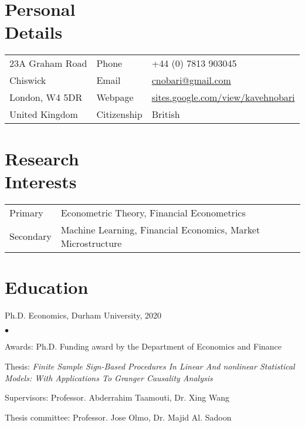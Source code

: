 \documentclass[margin,line,pifont,palatino,courier]{res}
\newenvironment{list2}{
  \begin{list}{$\bullet$}{%
      \setlength{\itemsep}{0in}
      \setlength{\parsep}{0in} \setlength{\parskip}{0in}
      \setlength{\topsep}{0in} \setlength{\partopsep}{0in}
      \setlength{\leftmargin}{0.2in}}}{\end{list}}
\begin{document}

\begin{resume}

\section{\sc \bf Personal\\ Details}

\vspace{.05in}

\begin{tabular}{@{}p{2.0in}p{0.70in}p{3.5in}}
23A Graham Road & Phone &+44 (0) 7813 903045 \\
Chiswick                        &Email &\href{mailto: cnobari@gmail.com}{cnobari@gmail.com}\\
London, W4 5DR      &Webpage &\href{https://sites.google.com/view/kavehnobari}{sites.google.com/view/kavehnobari}\\
United Kingdom      & Citizenship &British\\
\end{tabular}

\hrulefill
\section{\sc \bf Research\\ Interests}
\begin{tabular}{@{}p{0.65in}p{5in}}
Primary & Econometric Theory, Financial Econometrics \\
\rule{0pt}{4ex}Secondary      &Machine Learning, Financial Economics, Market Microstructure  \\
\end{tabular}

\hrulefill

\section{\sc \bf Education}

Ph.D. Economics, Durham University, 2020
\vspace*{+4ex}
\begin{list2}
\item Awards: Ph.D. Funding award by the Department of Economics and Finance
\item Thesis: \emph{Finite Sample Sign-Based Procedures In Linear And nonlinear Statistical Models: With Applications To Granger Causality Analysis}
\item Supervisors: Professor. Abderrahim Taamouti, Dr. Xing Wang
\item Thesis committee: Professor. Jose Olmo, Dr. Majid Al. Sadoon
\end{list2}


\end{resume}
\end{document}
